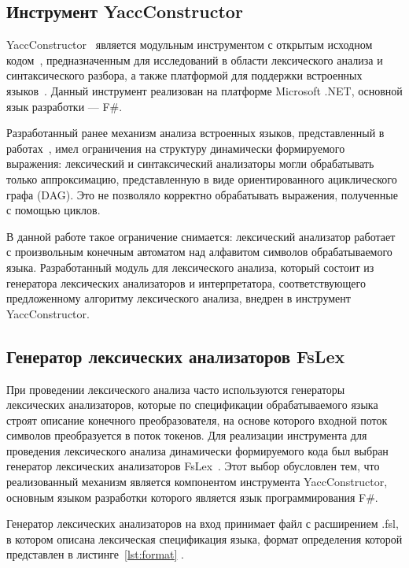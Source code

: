 \documentclass[10pt, conference, compsocconf]{IEEEtran}
\begin{document}
\subsection{Инструмент YaccConstructor}

YaccConstructor~\cite{YC_article} является модульным инструментом с открытым исходном кодом~\cite{YCrepo}, предназначенным для исследований в области лексического анализа и синтаксического разбора, а  также платформой для поддержки встроенных языков~\cite{YC_SECR}. Данный инструмент реализован на платформе Microsoft .NET, основной язык разработки --- F\#.  

Разработанный ранее механизм анализа встроенных языков, представленный в работах~\cite{YC_ru, YC_SECR}, имел ограничения на структуру динамически формируемого выражения: лексический и синтаксический анализаторы могли обрабатывать только аппроксимацию, представленную в виде ориентированного ациклического графа (DAG). Это не позволяло корректно обрабатывать выражения, полученные с помощью циклов.
    
В данной работе такое ограничение снимается: лексический анализатор работает с произвольным конечным автоматом над алфавитом символов обрабатываемого языка. Разработанный модуль для лексического анализа, который состоит из генератора лексических анализаторов и интерпретатора, соответствующего предложенному алгоритму лексического анализа, внедрен в инструмент YaccConstructor.    

\subsection{Генератор лексических анализаторов FsLex}

При проведении лексического анализа часто используются генераторы лексических анализаторов, которые по спецификации обрабатываемого языка строят описание конечного преобразователя, на основе которого входной поток символов преобразуется в поток токенов. Для реализации инструмента для проведения лексического анализа динамически формируемого кода был выбран генератор лексических анализаторов FsLex~\cite{FsLex}. Этот выбор обусловлен тем, что реализованный механизм является компонентом инструмента YaccConstructor, основным языком разработки которого является язык программирования F\#. 

Генератор лексических анализаторов на вход принимает файл с расширением .fsl, в котором описана лексическая спецификация  языка, формат определения которой представлен в листинге~\ref{lst:format} .
\end{document}
